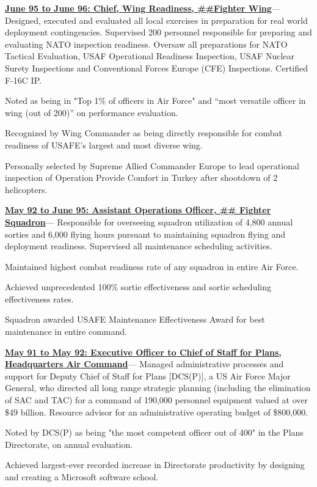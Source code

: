 \documentclass[10pt,letterpaper]{scrartcl}
\newenvironment{accomplishments}{%
	\begin{list}{\textbullet}{%
        \setlength\leftmargin{1em}      %
        \setlength\topsep{0ex}          %
        \setlength\parskip{0.5ex}
        \setstretch{0.8}
        \setlength\listparindent{1em}   %
        \setlength\parsep{0in}          %
        \setlength\itemsep{0.5ex}         %
        }
}{
	\end{list}
}
\newcommand{\accomplishment}{\item }
\newenvironment{job}[4]{%
\vspace{0.0em}
\noindent\textbf{\underline{{#1: #2\ifthenelse{\isempty{#3}}{}{, #3}}}}---#4%
\noindent\begin{accomplishments}{}
}{
\end{accomplishments}
\vspace{1.5em}
}
\begin{document}
\begin{job}{June 95 to June 96}{Chief, Wing Readiness, \#\#Fighter Wing}{}{%
Designed, executed and evaluated all local exercises in preparation
for real world deployment contingencies. Supervised 200 personnel responsible for preparing and evaluating NATO inspection
readiness. Oversaw all preparations for NATO Tactical Evaluation, USAF Operational Readiness Inspection, USAF Nuclear Surety
Inspections and Conventional Forces Europe (CFE) Inspections. Certified F-16C IP.
}
\accomplishment Noted as being in "Top 1\% of officers in Air Force" and “most versatile officer in wing (out of 200)” on performance evaluation.
\accomplishment Recognized by Wing Commander as being directly responsible for combat readiness of USAFE’s largest and most diverse wing.
\accomplishment Personally selected by Supreme Allied Commander Europe to lead operational inspection of Operation Provide Comfort in Turkey
after shootdown of 2 helicopters.
\end{job}

\begin{job}{May 92 to June 95}{Assistant Operations Officer, \#\# Fighter Squadron}{USAFB}{%
Responsible for overseeing squadron
utilization of 4,800 annual sorties and 6,000 flying hours pursuant to maintaining squadron flying and deployment readiness.
Supervised all maintenance scheduling activities.
}
\accomplishment Maintained highest combat readiness rate of any squadron in entire Air Force.
\accomplishment Achieved unprecedented 100\% sortie effectiveness and sortie scheduling effectiveness rates.
\accomplishment Squadron awarded USAFE Maintenance Effectiveness Award for best maintenance in entire command.
\end{job}

\begin{job}{May 91 to May 92}{Executive Officer to Chief of Staff for Plans, Headquarters Air Command}{}{%
Managed administrative
processes and support for Deputy Chief of Staff for Plans [DCS(P)], a US Air Force Major General, who directed all long range
strategic planning (including the elimination of SAC and TAC) for a command of 190,000 personnel equipment valued at over \$49
billion. Resource advisor for an administrative operating budget of \$800,000.
}
\accomplishment Noted by DCS(P) as being "the most competent officer out of 400" in the Plans Directorate, on annual evaluation.
\accomplishment Achieved largest-ever recorded increase in Directorate productivity by designing and creating a Microsoft software school.
\end{job}
\end{document}
